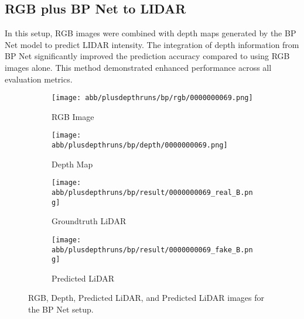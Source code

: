 \subsection{RGB plus BP Net to LIDAR}
In this setup, RGB images were combined with depth maps generated by the BP Net model to predict LIDAR intensity. The integration of depth information from BP Net significantly improved the prediction accuracy compared to using RGB images alone. This method demonstrated enhanced performance across all evaluation metrics.
\begin{figure}[!ht]
	\centering
	\begin{subfigure}{0.4\textwidth}
		\centering
		\texttt{[image: abb/plusdepthruns/bp/rgb/0000000069.png]}
		\caption{RGB Image}
		\label{fig:bp_rgb}
	\end{subfigure}
	
	\vspace{1em} %
	
	\begin{subfigure}{0.4\textwidth}
		\centering
		\texttt{[image: abb/plusdepthruns/bp/depth/0000000069.png]}
		\caption{Depth Map}
		\label{fig:bp_depth}
	\end{subfigure}
	
	\vspace{1em} %
	
	\begin{subfigure}{0.25\textwidth}
		\centering
		\texttt{[image: abb/plusdepthruns/bp/result/0000000069\_real\_B.png]}
		\caption{Groundtruth LiDAR}
		\label{fig:bp_pred_lidar}
	\end{subfigure}
	\begin{subfigure}{0.25\textwidth}
		\centering
		\texttt{[image: abb/plusdepthruns/bp/result/0000000069\_fake\_B.png]}
		\caption{Predicted LiDAR}
		\label{fig:bp_fake_lidar}
	\end{subfigure}
	
	\caption{RGB, Depth, Predicted LiDAR, and Predicted LiDAR images for the BP Net setup.}
	\label{fig:bpplusdepth}
\end{figure}

